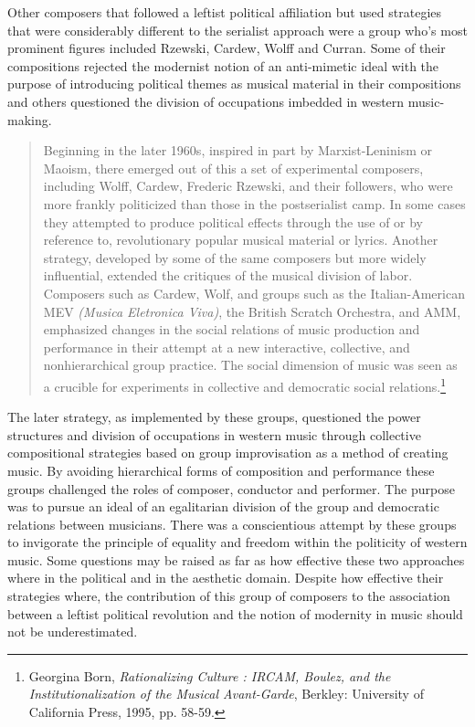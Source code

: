 Other composers that followed a leftist political affiliation but used strategies that were considerably different to the serialist approach were a group who's most prominent figures included Rzewski, Cardew, Wolff and Curran. Some of their compositions rejected the modernist notion of an anti-mimetic ideal with the purpose of introducing political themes as musical material in their compositions and others questioned the division of occupations imbedded in western music-making.

\begin{quote}
Beginning in the later 1960s, inspired in part by Marxist-Leninism or Maoism, there emerged out of this a set of experimental composers, including Wolff, Cardew, \mbox{Frederic} Rzewski, and their followers, who were more frankly politicized than those in the \mbox{postserialist} camp. In some cases they attempted to produce political effects through the use of or by reference to, revolutionary popular musical material or lyrics. Another strategy, developed  by some of the same composers but more widely influential, extended the critiques of the musical division of labor. Composers such as Cardew, Wolf, and groups such as the Italian-American MEV \emph{(Musica Eletronica Viva)}, the British Scratch Orchestra, and AMM, emphasized changes in the social relations of music production and performance in their attempt at a new interactive, collective, and nonhierarchical group practice. The social dimension of music was seen as a crucible for experiments in collective and democratic social relations.\footnote{Georgina Born, \emph{Rationalizing Culture : IRCAM, Boulez, and the Institutionalization of the Musical Avant-Garde}, Berkley: University of California Press, 1995, pp. 58-59.}
\end{quote}
The later strategy, as implemented by these groups, questioned the power structures and division of occupations in western music through collective compositional strategies based on group improvisation as a method of creating music. By avoiding hierarchical forms of composition and performance these groups challenged the roles of composer, conductor and performer. The purpose was to pursue an ideal of an egalitarian division of the group and democratic relations between musicians. There was a conscientious attempt by these groups to invigorate the principle of equality and freedom within the politicity of western music. Some questions may be raised as far as how effective these two approaches where in the political and in the aesthetic domain. Despite how effective their strategies where, the contribution of this group of composers to the association between a leftist political revolution and the notion of modernity in music should not be underestimated.

